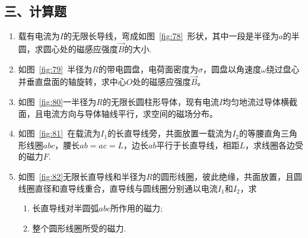 \subsection*{三、计算题}
\begin{enumerate}
    \item 载有电流为$I$的无限长导线，弯成如图~\ref{fig:78}~形状，其中一段是半径为$a$的半圆，求圆心处的磁感应强度$\vec{B}$的大小.
    \item 如图~\ref{fig:79}~半径为$R$的带电圆盘，电荷面密度为$\sigma$，圆盘以角速度$\omega$绕过盘心并垂直盘面的轴旋转，求中心$O$处的磁感应强度$\vec{B}$。
    \item 如图~\ref{fig:80}一半径为$R$的无限长圆柱形导体，现有电流$I$均匀地流过导体横截面，且电流方向与导体轴线平行，求空间的磁场分布。
    \item 如图~\ref{fig:81}~在载流为$I_1$的长直导线旁，共面放置一载流为$I_2$的等腰直角三角形线圈$abc$，腰长$ab=ac=L$，边长$ab$平行于长直导线，相距$L$，求线圈各边受的磁力$F$.
    \item 如图~\ref{fig:82}无限长直导线和半径为$R$的圆形线圈，彼此绝缘，共面放置，且圆线圈直径和直导线重合，直导线与圆线圈分别通以电流$I_1$和$I_2$，求
    \begin{enumerate}[label=(\arabic*)]
        \item 长直导线对半圆弧$abc$所作用的磁力;
        \item 整个圆形线圈所受的磁力.
    \end{enumerate}
\end{enumerate}
